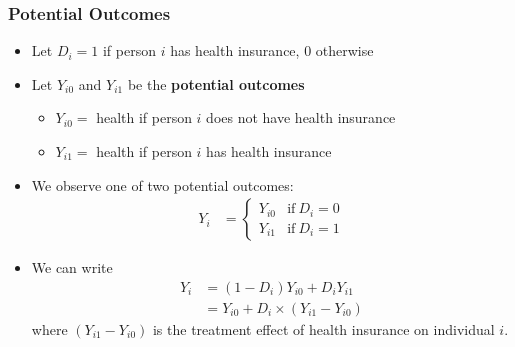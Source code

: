 \begin{frame}
\frametitle{Potential Outcomes}
\begin{itemize}
\item Let $D_i = 1$ if person $i$ has health insurance, $0$ otherwise
\item Let $Y_{i0}$ and $Y_{i1}$ be the \textbf{potential outcomes}
\begin{itemize}
\item $Y_{i0} =$ health if person $i$ does not have health insurance
\item $Y_{i1} =$ health if person $i$ has health insurance
\end{itemize}
\item We observe one of two potential outcomes:
\begin{align*}
Y_i    & =  
\begin{cases} 
Y_{i0} & \text{if}~ D_i = 0 \\
Y_{i1} & \text{if}~ D_i = 1 
\end{cases} 
\end{align*}
\item We can write
\begin{align*}
Y_i & = (1 - D_i) Y_{i0} + D_i Y_{i1} \\
    & =  Y_{i0} + D_i \times (Y_{i1} - Y_{i0})
\end{align*}
where $(Y_{i1} - Y_{i0})$ is the treatment effect of health insurance on individual $i$.
\end{itemize}
\end{frame}


